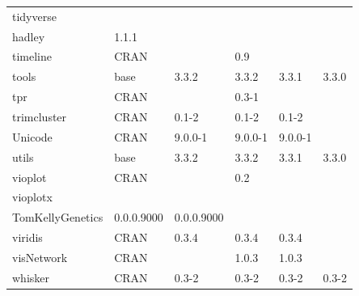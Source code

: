 \begin{longtable}{llllll}
\rowcolor{black!5}
tidyverse                     & \begin{tabular}[c]{@{}l@{}}GitHub \\ hadley \end{tabular}            & 1.1.1       &             &                &                    \\
\rowcolor{black!10}
timeline                      & CRAN                      &             & 0.9         &                &                   \\
\rowcolor{black!5}
tools                         & base                      & 3.3.2       & 3.3.2       & 3.3.1          & 3.3.0              \\
\rowcolor{black!10}
tpr                           & CRAN                      &             & 0.3-1       &                &                   \\
\rowcolor{black!5}
trimcluster                   & CRAN                      & 0.1-2       & 0.1-2       & 0.1-2          &                    \\
\rowcolor{black!10}
Unicode                       & CRAN                      & 9.0.0-1     & 9.0.0-1     & 9.0.0-1        &                   \\
\rowcolor{black!5}
utils                         & base                      & 3.3.2       & 3.3.2       & 3.3.1          & 3.3.0              \\
\rowcolor{black!10}
vioplot                       & CRAN                      &             & 0.2         &                &                   \\
\rowcolor{black!5}
vioplotx                      & \begin{tabular}[c]{@{}l@{}}GitHub \\ TomKellyGenetics \end{tabular}  & 0.0.0.9000  & 0.0.0.9000  &                &                    \\
\rowcolor{black!10}
viridis                       & CRAN                      & 0.3.4       & 0.3.4       & 0.3.4          &                   \\
\rowcolor{black!5}
visNetwork                    & CRAN                      &             & 1.0.3       & 1.0.3          &                    \\
\rowcolor{black!10}
whisker                       & CRAN                      & 0.3-2       & 0.3-2       & 0.3-2          & 0.3-2             \\

\end{longtable}
